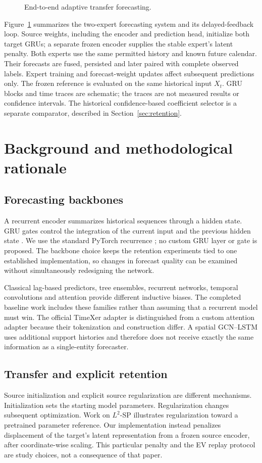 \documentclass[pdflatex,iicol,sn-mathphys-num]{sn-jnl}
\begin{document}
\begin{figure}[t]
\centering\resizebox{\textwidth}{!}{}
\caption{End-to-end adaptive transfer forecasting.}\label{fig:model}
\end{figure}
Figure~\ref{fig:model} summarizes the two-expert forecasting system and its delayed-feedback loop. Source weights, including the encoder and prediction head, initialize both target GRUs; a separate frozen encoder supplies the stable expert's latent penalty. Both experts use the same permitted history and known future calendar. Their forecasts are fused, persisted and later paired with complete observed labels. Expert training and forecast-weight updates affect subsequent predictions only. The frozen reference is evaluated on the same historical input $X_t$. GRU blocks and time traces are schematic; the traces are not measured results or confidence intervals. The historical confidence-based coefficient selector is a separate comparator, described in Section~\ref{sec:retention}.

\section{Background and methodological rationale}
\subsection{Forecasting backbones}
A recurrent encoder summarizes historical sequences through a hidden state. GRU gates control the integration of the current input and the previous hidden state \cite{cho2014}. We use the standard PyTorch recurrence \cite{pytorch211}; no custom GRU layer or gate is proposed. The backbone choice keeps the retention experiments tied to one established implementation, so changes in forecast quality can be examined without simultaneously redesigning the network.

Classical lag-based predictors, tree ensembles, recurrent networks, temporal convolutions and attention provide different inductive biases. The completed baseline work includes these families rather than assuming that a recurrent model must win. The official TimeXer adapter \cite{wang2024timexer} is distinguished from a custom attention adapter because their tokenization and construction differ. A spatial GCN--LSTM uses additional support histories and therefore does not receive exactly the same information as a single-entity forecaster.

\subsection{Transfer and explicit retention}
Source initialization and explicit source regularization are different mechanisms. Initialization sets the starting model parameters. Regularization changes subsequent optimization. Work on $L^2$-SP \cite{li2018} illustrates regularization toward a pretrained parameter reference. Our implementation instead penalizes displacement of the target's latent representation from a frozen source encoder, after coordinate-wise scaling. This particular penalty and the EV replay protocol are study choices, not a consequence of that paper.
\end{document}
